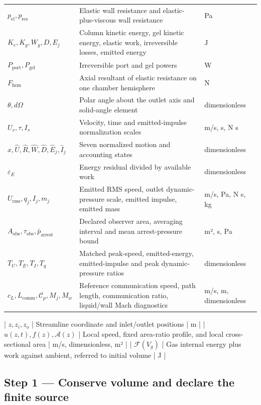 \documentclass[11pt]{article}
\begin{document}
\begin{longtable}{p{}p{}p{}}
\(p_{\mathrm{el}},p_{\mathrm{res}}\) & Elastic wall resistance and elastic-plus-viscous wall resistance & Pa \\
\(K_c,K_g,W_g,D,E_j\) & Column kinetic energy, gel kinetic energy, elastic work, irreversible losses, emitted energy & J \\
\(P_{\mathrm{port}},P_{\mathrm{gel}}\) & Irreversible port and gel powers & W \\
\(F_{\mathrm{hem}}\) & Axial resultant of elastic resistance on one chamber hemisphere & N \\
\(\theta,d\Omega\) & Polar angle about the outlet axis and solid-angle element & dimensionless \\
\(U_s,\tau,I_s\) & Velocity, time and emitted-impulse normalization scales & m/s, s, N s \\
\(\widehat x,\widehat U,\widehat R,\widehat W,\widehat D,\widehat E_j,\widehat I_j\) & Seven normalized motion and accounting states & dimensionless \\
\(\varepsilon_E\) & Energy residual divided by available work & dimensionless \\
\(U_{\mathrm{rms}},q_j,I_j,m_j\) & Emitted RMS speed, outlet dynamic-pressure scale, emitted impulse, emitted mass & m/s, Pa, N s, kg \\
\(A_{\mathrm{obs}},\tau_{\mathrm{obs}},\bar p_{\mathrm{arrest}}\) & Declared observer area, averaging interval and mean arrest-pressure bound & m², s, Pa \\
\(T_U,T_E,T_I,T_q\) & Matched peak-speed, emitted-energy, emitted-impulse and peak dynamic-pressure ratios & dimensionless \\
\(c_L,L_{\mathrm{comm}},\mathcal C_p,M_j,M_w\) & Reference communication speed, path length, communication ratio, liquid/wall Mach diagnostics & m/s, m, dimensionless \\
\end{longtable}

| \(z,z_i,z_o\) | Streamline coordinate and inlet/outlet positions | m |
| \(u(z,t),f(z),\mathcal A(z)\) | Local speed, fixed area-ratio profile, and local cross-sectional area | m/s, dimensionless, m² |
| \(\mathcal F(V_g)\) | Gas internal energy plus work against ambient, referred to initial volume | J |



\subsection*{Step 1 — Conserve volume and declare the finite source}
\end{document}
